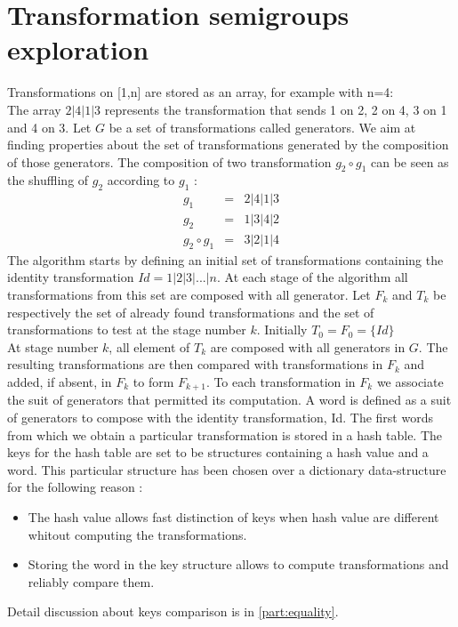 {\section{Transformation semigroups exploration}
\label{note}
Transformations on [1,n] are stored as an array, for example with n=4:\\
The array $2|4|1|3$ represents the transformation that sends 1 on 2, 2 on 4, 3 on 1 and 4 on 3.
Let $G$ be a set of transformations called generators. We aim at finding properties about the set of transformations generated by the composition of those generators.
The composition of two transformation $g_2\circ g_1$ can be seen as the shuffling of $g_2$ according to $g_1$ :
\begin{eqnarray*}
g_1 &=& 2|4|1|3\\
g_2 &=& 1|3|4|2\\
g_2\circ g_1 &=& 3|2|1|4
\end{eqnarray*}
The algorithm starts by defining an initial set of transformations containing the identity transformation $Id = 1|2|3|...|n$.
At each stage of the algorithm all transformations from this set are composed with all generator.  
Let $F_k$ and $T_k$ be respectively the set of already found transformations and the set of transformations to test at the stage number $k$.
Initially $T_0 = F_0 = \{Id\}$\\
At stage number $k$, all element of $T_k$ are composed with all generators in $G$. 
The resulting transformations are then compared with transformations in $F_k$ and added, if absent, in $F_k$ to form $F_{k+1}$.
To each transformation in $F_k$ we associate the suit of generators that permitted its computation.
A word is defined as a suit of generators to compose with the identity transformation, Id.
The first words from which we obtain a particular transformation is stored in a hash table.
The keys for the hash table are set to be structures containing a hash value and a word. 
This particular structure has been chosen over a dictionary data-structure for the following reason :
\begin{itemize}
\item The hash value allows fast distinction of keys when hash value are different whitout computing the transformations.
\item Storing the word in the key structure allows to compute transformations and reliably compare them.
\end{itemize}
Detail discussion about keys comparison is in \autoref{part:equality}.

}

